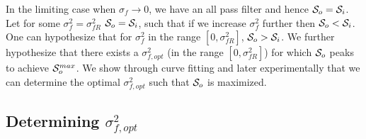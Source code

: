 \documentclass[journal,onecolumn]{IEEEtran}
\newcommand{\g}{f}
\renewcommand{\S}{{\cal S}}
\begin{document}
In the limiting case when 
$\sigma_\g \rightarrow 0$,  we have an all pass filter and hence 
$\S_o = \S_i$. 
Let for some $\sigma_\g^2 = \sigma_{\g R}^2$ 
$\S_o = \S_i$, such that  
if we increase $\sigma_\g^2$ further then $\S_o < \S_i$. 
One can hypothesize that for $\sigma_\g^2$ in the range 
$[0,\sigma_{\g R}^2]$, $\S_o > \S_i$. 
We further hypothesize that there exists a 
$\sigma_{\g,{opt}}^2$ (in the range $[0,\sigma_{\g R}^2]$) for which $\S_o$ 
peaks to achieve $\S_{o}^{max}$. We show through curve fitting and later 
experimentally that we can determine the optimal $\sigma_{\g,opt}^2$ 
such that $\S_o$ is maximized.

\subsection{Determining $\sigma_{\g,opt}^2$}
\end{document}

